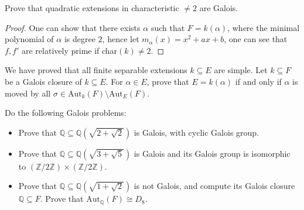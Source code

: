 \documentclass[openany]{book}
\begin{document}
\begin{prob}
Prove that quadratic extensions in characteristic $\neq 2$ are Galois.
\end{prob}
\begin{proof}
    One can show that there exists $\alpha$ such that $F=k(\alpha)$, where the minimal polynomial of $\alpha$ is degree $2$, hence let $m_\alpha(x)=x^2+ax+b$, one can see that $f,f'$ are relatively prime if char$(k)\neq 2$.
\end{proof}









\begin{prob}
We have proved that all finite separable extensions $k \subseteq E$ are simple. Let $k \subseteq F$ be a Galois closure of $k \subseteq E$. For $\alpha \in E$, prove that $E = k(\alpha)$ if and only if $\alpha$ is moved by all $\sigma \in \text{Aut}_k(F) \setminus \text{Aut}_E(F)$.
\end{prob}




\begin{prob}
    Do the following Galois problems:
\begin{itemize}
    \item Prove that $\mathbb{Q} \subseteq \mathbb{Q}(\sqrt{2 + \sqrt{2}})$ is Galois, with cyclic Galois group.
    \item Prove that $\mathbb{Q} \subseteq \mathbb{Q}(\sqrt{3 + \sqrt{5}})$ is Galois and its Galois group is isomorphic to $(\mathbb{Z}/2\mathbb{Z}) \times (\mathbb{Z}/2\mathbb{Z})$.
    \item Prove that $\mathbb{Q} \subseteq \mathbb{Q}(\sqrt{1 + \sqrt{2}})$ is not Galois, and compute its Galois closure $\mathbb{Q} \subseteq F$. Prove that $\text{Aut}_{\mathbb{Q}}(F) \cong D_8$.
\end{itemize}
\end{prob}
\end{document}
